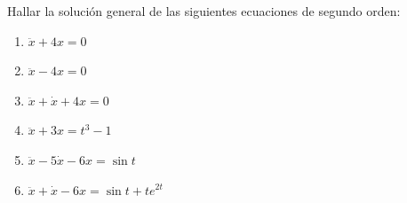 \begin{ejer}
Hallar la solución general de las siguientes ecuaciones de segundo orden:
\begin{enumerate}[label = (\alph*)]
\item $\ddot{x} + 4x = 0$

\item $\ddot{x} - 4x = 0$

\item $\ddot{x} + \dot{x} + 4x = 0$

\item $\ddot{x} + 3x = t^3 - 1$

\item $\ddot{x} - 5\dot{x} - 6x = \sin t$

\item $\ddot{x} + \dot{x} - 6x = \sin t + te^{2t}$
\end{enumerate}
\end{ejer}
